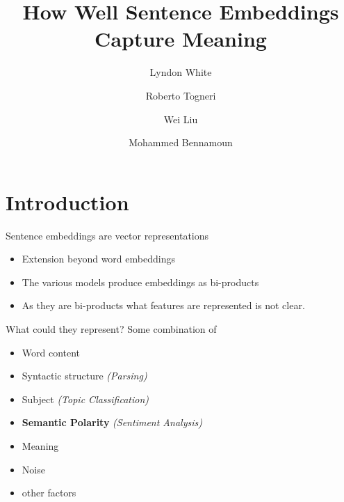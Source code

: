 \documentclass[12pt,landscape,english]{beamer}
\begin{document}

\title[White et al.]{How Well Sentence Embeddings Capture Meaning}
\author[White et al.]{Lyndon White \and Roberto Togneri \and Wei Liu \and Mohammed Bennamoun}
\date{}

\begin{frame}[plain]
	\titlepage
\end{frame}



\section{Introduction}
\begingroup %
\begin{frame}{Sentence embeddings are vector representations}
	\begin{itemize}
		\item Extension beyond word embeddings
		\item The various models produce embeddings as bi-products
		\item As they are bi-products what features are represented is not clear.
	\end{itemize}
	
	
\end{frame}
\endgroup
\begin{frame}{What could they represent?}
	Some combination of
	\begin{itemize}
		\item Word content
		\item Syntactic structure \hfill \emph{(Parsing)}
		\item Subject \hfill \emph{(Topic Classification)}
		\item \textbf{Semantic Polarity} \hfill \emph{(Sentiment Analysis)}
		\item Meaning 
		\item Noise
		\item other factors
	\end{itemize}
\end{frame}
\end{document}
